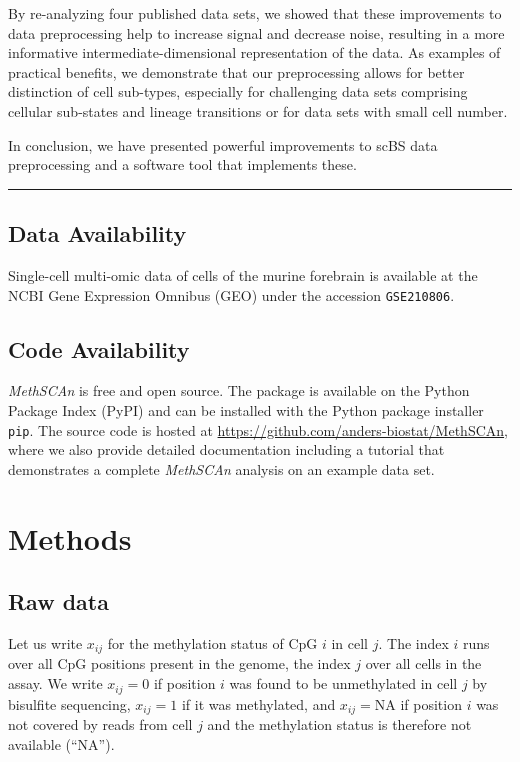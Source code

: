 \documentclass[twocolumn,10pt]{article}
\newcommand{\new}[1]{#1} %
\begin{document}
By re-analyzing \new{four} published data sets, we showed that these improvements to data preprocessing help to increase signal and decrease noise, resulting in a more informative intermediate-dimensional representation of the data.
As examples of practical benefits, we demonstrate that our preprocessing allows for better distinction of cell sub-types, especially for challenging data sets comprising cellular sub-states and lineage transitions or for data sets with small cell number.

In conclusion, we have presented powerful improvements to scBS data preprocessing and a software tool that implements these.

\vspace{1.4ex}
\noindent\hfil\rule{.6\columnwidth}{.2pt}\hfil



\subsection{Data Availability}

Single-cell multi-omic data of cells of the murine forebrain \citep{kremer_scnmt} is available at the NCBI Gene Expression Omnibus (GEO) under the accession \texttt{GSE210806}.


\subsection{Code Availability}

\textit{MethSCAn} is free and open source.
The package is available on the Python Package Index (PyPI) and can be installed with the Python package installer \texttt{pip}.
The source code is hosted at \href{https://github.com/anders-biostat/MethSCAn}{https://github.com/anders-biostat/MethSCAn}, where we also provide detailed documentation including a tutorial that demonstrates a complete \textit{MethSCAn} analysis on an example data set.


\section{Methods}

\subsection{Raw data}

Let us write $x_{ij}$ for the methylation status of CpG $i$ in cell $j$.
The index $i$ runs over all CpG positions present in the genome, the index $j$ over all cells in the assay.
We write $x_{ij}=0$ if position $i$ was found to be unmethylated in cell $j$ by bisulfite sequencing, $x_{ij}=1$ if it was methylated, and $x_{ij}=\text{NA}$ if position $i$ was not covered by reads from cell $j$ and the methylation status is therefore not available (``NA'').
\end{document}
